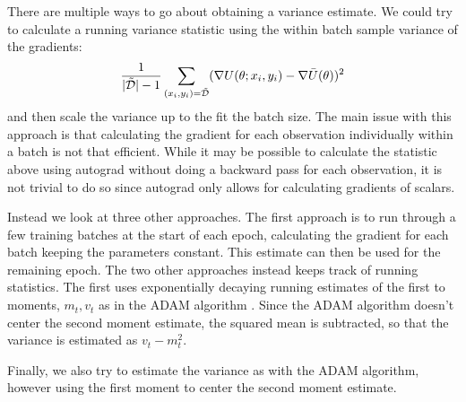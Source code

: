 There are multiple ways to go about obtaining a variance estimate.
We could try to calculate a running variance statistic using the within batch sample variance of the gradients:
\begin{equation}
    \frac{1}{|\tilde{\mathcal{D}}|-1}\sum_{(x_i,y_i)=\tilde{\mathcal{D}}} (\nabla U(\theta; x_i, y_i) - \nabla \bar{U}(\theta))^2
\end{equation}
and then scale the variance up to the fit the batch size. 
The main issue with this approach is that calculating the gradient for each observation individually within a batch is not that efficient.
While it may be possible to calculate the statistic above using autograd without doing a backward pass for each observation, it is not trivial to do so since autograd only allows for calculating gradients of scalars. 

Instead we look at three other approaches. 
The first approach is to run through a few training batches at the start of each epoch, calculating the gradient for each batch keeping the parameters constant. 
This estimate can then be used for the remaining epoch. 
The two other approaches instead keeps track of running statistics. 
The first uses exponentially decaying running estimates of the first to moments, $m_t, v_t$ as in the ADAM algorithm \cite{kingma_adam_2017}.
Since the ADAM algorithm doesn't center the second moment estimate, the squared mean is subtracted, so that the variance is estimated as $v_t - m_t^2$.

Finally, we also try to estimate the variance as with the ADAM algorithm, however using the first moment to center the second moment estimate. 


